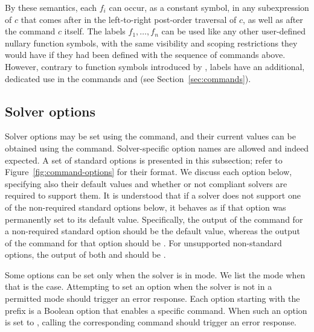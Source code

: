 By these semantics, each  $f_i$ can occur, as a constant symbol, 
in any subexpression of $c$ that comes after  
in the left-to-right post-order traversal of $c$, as well as after the command $c$ itself.
The labels $f_1, \ldots, f_n$ can be used like any other user-defined nullary
function symbols, with the same visibility and scoping restrictions 
they would have if they had been defined with the sequence of commands above. 
However, contrary to function symbols introduced by ,
labels have an additional, dedicated use in the commands 
 and 
(see Section~\ref{sec:commands}).


\subsection{Solver options} \label{sec:options}

Solver options may be set using the  command, and their current
values can be obtained using the  command.
Solver-specific option names are allowed and indeed expected.  
A set of standard options is presented in this subsection;
refer to Figure~\ref{fig:command-options} for their format. 
We discuss each option below, specifying also their default values and 
whether or not compliant solvers are required to support them. 
It is understood that if a solver does not support one of the non-required 
standard options below, it behaves as if that option was permanently
set to its default value.
Specifically, the output of the  command for a non-required
standard option should be the default value, whereas the output of
the  command for that option should be .
For unsupported non-standard options, the output of both 
and  should be .

Some options can be set only when the solver is in  mode.
We list the mode when that is the case.
Attempting to set an option when the solver is not in a permitted mode 
should trigger an error response.
Each option starting with the  prefix is a Boolean option
that enables a specific command.
When such an option is set to , calling the corresponding
command should trigger an error response.

